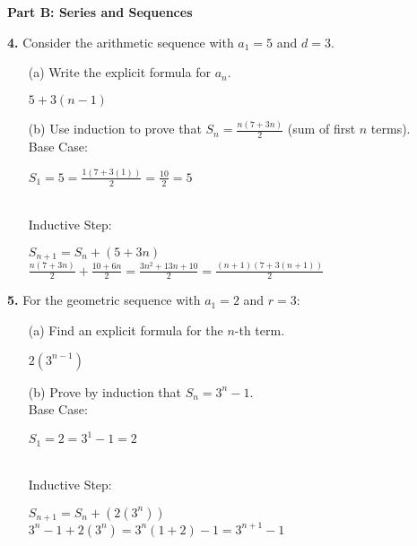 \documentclass[12pt]{article}
\begin{document}
\textbf{Part B: Series and Sequences}

\textbf{4.} Consider the arithmetic sequence with $a_1 = 5$ and $d = 3$.

\begin{enumerate}
\item[(a)] Write the explicit formula for $a_n$.
\\[8pt]
\begin{minipage}[t][1cm][t]{\linewidth}
    $\displaystyle 5+3(n-1)$
\end{minipage}

\item[(b)] Use induction to prove that $S_n = \frac{n(7 + 3n)}{2}$ (sum of first $n$ terms).
\\[8pt]
Base Case:
\\[8pt]
\begin{minipage}[t][1cm][t]{\linewidth}
    $\displaystyle S_1=5=\frac{1(7+3(1))}{2}=\frac{10}{2}=5$
\end{minipage}
\\[8pt]
Inductive Step:
\\[8pt]
\begin{minipage}[t][2cm][t]{\linewidth}
    $\displaystyle S_{n+1}=S_n+(5+3n)$
    \\[8pt] $\frac{n(7+3n)}{2}+\frac{10+6n}{2}=\frac{3n^2+13n+10}{2}=\frac{(n+1)(7+3(n+1))}{2}$
\end{minipage}
\end{enumerate}

\textbf{5.} For the geometric sequence with $a_1 = 2$ and $r = 3$:

\begin{enumerate}
\item[(a)] Find an explicit formula for the $n$-th term.
\\[8pt]
\begin{minipage}[t][1cm][t]{\linewidth}
    $\displaystyle 2(3^{n-1})$
\end{minipage}

\item[(b)] Prove by induction that $S_n = 3^n - 1$.
\\[8pt]
Base Case:
\\[8pt]
\begin{minipage}[t][1cm][t]{\linewidth}
    $\displaystyle S_1=2=3^1-1=2$
\end{minipage}
\\[8pt]
Inductive Step:
\\[8pt]
\begin{minipage}[t][2cm][t]{\linewidth}
    $\displaystyle S_{n+1}=S_n+(2(3^n))$
    \\[8pt] $3^n-1+2(3^n)=3^n(1+2)-1=3^{n+1}-1$
\end{minipage}
\end{enumerate}
\end{document}
